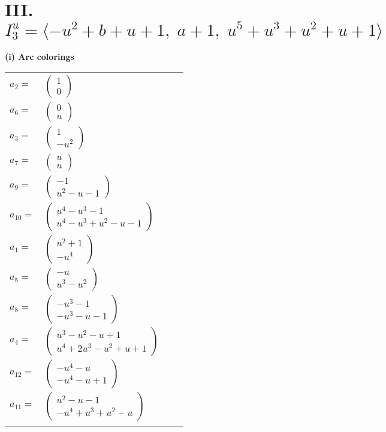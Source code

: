 \documentclass[1p]{elsarticle_modified}
\theoremstyle{definition}
\begin{document}
\centering \section*{III. $I^u_{3}= \langle - u^2+b+u+1,\;a+1,\;u^5+u^3+u^2+u+1 \rangle$}
\flushleft \textbf{(i) Arc colorings}\\
\begin{tabular}{m{7pt} m{180pt} m{7pt} m{180pt} }
\flushright $a_{2}=$&$\begin{pmatrix}1\\0\end{pmatrix}$ \\
\flushright $a_{6}=$&$\begin{pmatrix}0\\u\end{pmatrix}$ \\
\flushright $a_{3}=$&$\begin{pmatrix}1\\- u^2\end{pmatrix}$ \\
\flushright $a_{7}=$&$\begin{pmatrix}u\\u\end{pmatrix}$ \\
\flushright $a_{9}=$&$\begin{pmatrix}-1\\u^2- u-1\end{pmatrix}$ \\
\flushright $a_{10}=$&$\begin{pmatrix}u^4- u^3-1\\u^4- u^3+u^2- u-1\end{pmatrix}$ \\
\flushright $a_{1}=$&$\begin{pmatrix}u^2+1\\- u^4\end{pmatrix}$ \\
\flushright $a_{5}=$&$\begin{pmatrix}- u\\u^3- u^2\end{pmatrix}$ \\
\flushright $a_{8}=$&$\begin{pmatrix}- u^3-1\\- u^3- u-1\end{pmatrix}$ \\
\flushright $a_{4}=$&$\begin{pmatrix}u^3- u^2- u+1\\u^4+2 u^3- u^2+u+1\end{pmatrix}$ \\
\flushright $a_{12}=$&$\begin{pmatrix}- u^4- u\\- u^4- u+1\end{pmatrix}$ \\
\flushright $a_{11}=$&$\begin{pmatrix}u^2- u-1\\- u^4+u^3+u^2- u\end{pmatrix}$\\&\end{tabular}
\end{document}
